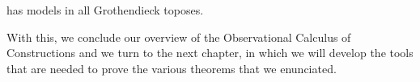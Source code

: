 \begin{theorem}
	\SetoidCC has models in all Grothendieck toposes.
\end{theorem}

With this, we conclude our overview of the Observational Calculus of 
Constructions and we turn to the next chapter, in which we will develop the
tools that are needed to prove the various theorems that we enunciated.



